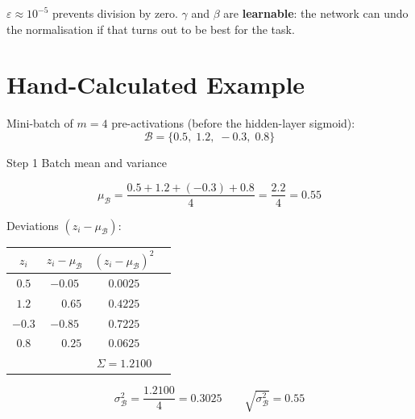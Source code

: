 \documentclass[12pt, a4paper]{article}
\newif\ifstudentmode
\newcommand{\sol}[2][6cm]{%
  \ifstudentmode\underline{\hspace{#1}}\else{#2}\fi}
\theoremstyle{definition}
\newcommand{\muB}{\mu_{\mathcal{B}}}
\newcommand{\sigB}{\sigma^2_{\mathcal{B}}}
\begin{document}
$\varepsilon \approx 10^{-5}$ prevents division by zero.
$\gamma$ and $\beta$ are \textbf{learnable}: the network can undo the
normalisation if that turns out to be best for the task.

\section{Hand-Calculated Example}

Mini-batch of $m = 4$ pre-activations (before the hidden-layer sigmoid):
\[
  \mathcal{B} = \{0.5,\; 1.2,\; -0.3,\; 0.8\}
\]

\begin{stepbox}{Step 1 \quad Batch mean and variance}

\[
  \muB = \frac{0.5 + 1.2 + (-0.3) + 0.8}{4}
       = \frac{2.2}{4}
       = \sol[3cm]{0.55}
\]

Deviations $(z_i - \muB)$:

\begin{center}
\renewcommand{\arraystretch}{1.3}
\begin{tabular}{cccc}
\toprule
$z_i$ & $z_i - \muB$ & $(z_i - \muB)^2$ \\
\midrule
$0.5$  & $-0.05$ & $0.0025$ \\
$1.2$  & $\phantom{-}0.65$ & $0.4225$ \\
$-0.3$ & $-0.85$ & $0.7225$ \\
$0.8$  & $\phantom{-}0.25$ & $0.0625$ \\
\midrule
       &         & $\Sigma = 1.2100$ \\
\bottomrule
\end{tabular}
\end{center}

\[
  \sigB = \frac{1.2100}{4} = \sol[3cm]{0.3025}
  \qquad
  \sqrt{\sigB} = \sol[3cm]{0.55}
\]
\end{stepbox}

\vspace{0.8em}
\end{document}
